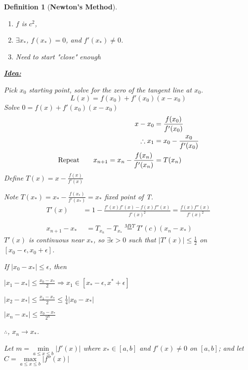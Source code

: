 \documentclass[12pt]{article}
\newcommand{\abs}[1]{\left| #1 \right|}
\theoremstyle{plain}
\newtheorem{definition}{Definition}[section]
\begin{document}
	\begin{definition}[\textbf{Newton's Method}]
		$ $
		\begin{enumerate}
			\item $f$ is $c^2$, 
			\item $\exists x_*$, $f(x_*) = 0$, and $f'(x_*) \neq 0$.
			\item Need to start "close" enough\\
		\end{enumerate}
		
	\textbf{\underline{Idea:}}
	
	Pick $x_0 $ starting point, solve for the zero of the tangent line at $x_0$.
	\[
		L(x) = f(x_0) +f'(x_0) (x-x_0)
	\]
	Solve $0 = f(x)+f'(x_0) (x-x_0)$ 
	\begin{align*}
		x - x_0	&=\frac{f(x_0)}{f'(x_0)}\\
		\therefore x_1 &= x_0-\frac{x_0}{f'(x_0)}\\
		\text{Repeat\qquad }x_{n+1} = x_n - \frac{f(x_n)}{f'(x_n)} &= T(x_n)
	\end{align*}
	Define $T(x) = x - \frac{f(x)}{f'(x)}$
	
	Note $T(x_*)=x_* - \frac{f(x_*)}{f'(x_*)}=x_*$ fixed point of T.
	\begin{align*}
		T'(x) &= 1-\frac{f'(x)f'(x)-f(x)f''(x)}{f'(x)^2}
			= \frac{f(x)f''(x)}{f'(x)^2}\\\\
	 	x_{n+1}-x_* 
	 				&\,\,\,= T_{x_n} -T_{x_*} 
	 				\overset{MVT}{=} T'(c) (x_n -x_*) \tag{c between $x_n$ and $x_*$}
	\end{align*}
	$T'(x)$ is continuous near $x_*$, so $\exists \epsilon > 0$ such that
	$\abs{T'(x)} \leq \frac12$ on $[x_0-\epsilon, x_0+\epsilon]$.

	If $\abs{x_0-x_*}\leq \epsilon$, then 
	\begin{description}
		\item $\abs{x_1-x_*} \leq \frac{x_0-x_*}2
			\Rightarrow x_1\in [x_*-\epsilon, x^*+\epsilon]$
		\item $\abs{x_2-x_*} \leq \frac{x_1-x_*}2 \leq \frac14 \abs{x_0-x_*}$
		\item $\abs{x_n-x_*} \leq \frac{x_0-x_*}{2^n}$
	\end{description}

	$\therefore$, $x_n\to x_*$.

	Let $m = \underset{a\leq x\leq b}{\min}\abs{f'(x)}$ 
	where $x_* \in [a,b]$ and $f'(x) \neq 0$ on $[ a , b ]$;
	and let $C=\underset{a\leq x \leq b}{\max} \abs{f''(x)}$ 


\end{definition}
\end{document}
